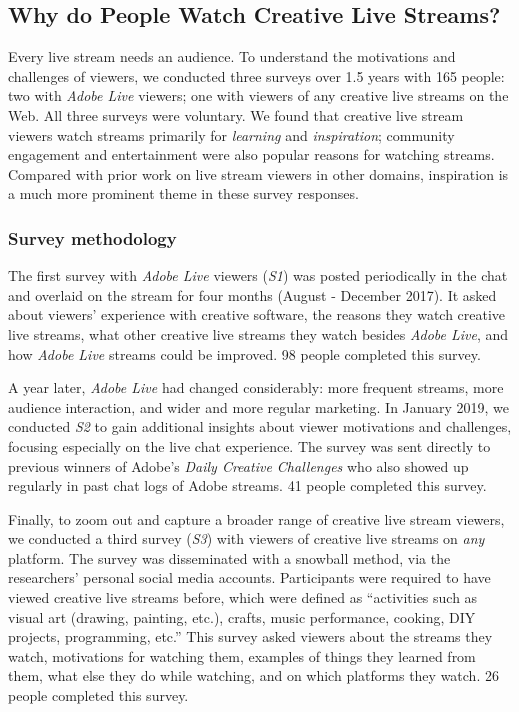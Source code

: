 \subsection{Why do People Watch Creative Live Streams?}
Every live stream needs an audience. To understand the motivations and challenges of viewers, we conducted three surveys over 1.5 years with 165 people: two with \textit{Adobe Live} viewers; one with viewers of any creative live streams on the Web. All three surveys were voluntary. We found that creative live stream viewers watch streams primarily for \textit{learning} and \textit{inspiration}; community engagement and entertainment were also popular reasons for watching streams. Compared with prior work on live stream viewers in other domains, inspiration is a much more prominent theme in these survey responses.

\subsubsection{Survey methodology}
The first survey with \textit{Adobe Live} viewers (\textit{S1}) was posted periodically in the chat and overlaid on the stream for four months (August - December 2017). It asked about viewers' experience with creative software, the reasons they watch creative live streams, what other creative live streams they watch besides \textit{Adobe Live}, and how \textit{Adobe Live} streams could be improved. 98 people completed this survey.

A year later, \textit{Adobe Live} had changed considerably: more frequent streams, more audience interaction, and wider and more regular marketing. In January 2019, we conducted \textit{S2} to gain additional insights about viewer motivations and challenges, focusing especially on the live chat experience. The survey was sent directly to previous winners of Adobe's \textit{Daily Creative Challenges} who also showed up regularly in past chat logs of Adobe streams. 41 people completed this survey.

Finally, to zoom out and capture a broader range of creative live stream viewers, we conducted a third survey (\textit{S3}) with viewers of creative live streams on \textit{any}  platform. The survey was disseminated with a snowball method, via the researchers' personal social media accounts. Participants were required to have viewed creative live streams before, which were defined as ``activities such as visual art (drawing, painting, etc.), crafts, music performance, cooking, DIY projects, programming, etc.'' This survey asked viewers about the streams they watch, motivations for watching them, examples of things they learned from them, what else they do while watching, and on which platforms they watch. 26 people completed this survey.


